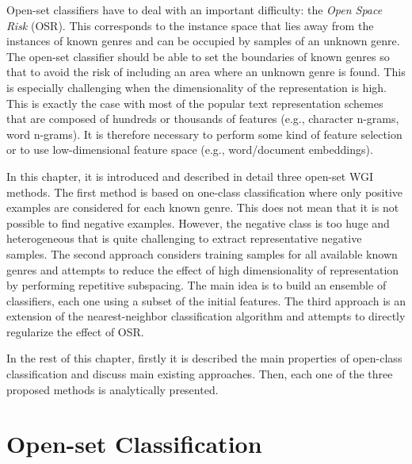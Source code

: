 Open-set classifiers have to deal with an important difficulty: the \textit{Open Space Risk} (OSR). This corresponds to the instance space that lies away from the instances of known genres and can be occupied by samples of an unknown genre. The open-set classifier should be able to set the boundaries of known genres so that to avoid the risk of including an area where an unknown genre is found. This is especially challenging when the dimensionality of the representation is high. This is exactly the case with most of the popular text representation schemes that are composed of hundreds or thousands of features (e.g., character n-grams, word n-grams). It is therefore necessary to perform some kind of feature selection or to use low-dimensional feature space (e.g., word/document embeddings). 

In this chapter, it is introduced and described in detail three open-set WGI methods. The first method is based on one-class classification where only positive examples are considered for each known genre. This does not mean that it is not possible to find negative examples. However, the negative class is too huge and heterogeneous that is quite challenging to extract representative negative samples. The second approach considers training samples for all available known genres and attempts to reduce the effect of high dimensionality of representation by performing repetitive subspacing. The main idea is to build an ensemble of classifiers, each one using a subset of the initial features. The third approach is an extension of the nearest-neighbor classification algorithm and attempts to directly regularize the effect of OSR.


In the rest of this chapter, firstly it is described the main properties of open-class classification and discuss main existing approaches. Then, each one of the three proposed methods is analytically presented. 

\section{Open-set Classification}

